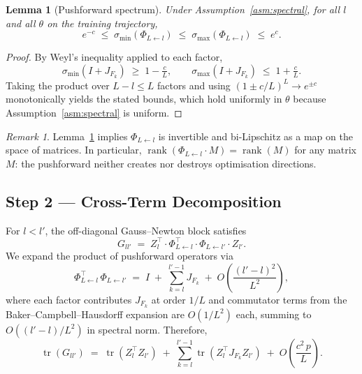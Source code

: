 \documentclass[11pt]{article}
\theoremstyle{plain}
\newtheorem{lemma}[theorem]{Lemma}
\theoremstyle{definition}
\theoremstyle{remark}
\newtheorem{remark}[theorem]{Remark}
\newcommand{\smin}{\sigma_{\min}}
\newcommand{\smax}{\sigma_{\max}}
\newcommand{\tr}{\operatorname{tr}}
\newcommand{\rank}{\operatorname{rank}}
\begin{document}
\begin{lemma}[Pushforward spectrum]
\label{lem:pushforward}
Under Assumption~\ref{asm:spectral}, for all $l$ and all $\theta$ on the
training trajectory,
\[
  e^{-c}
  \;\leq\;
  \smin\!\left(\Phi_{L\leftarrow l}\right)
  \;\leq\;
  \smax\!\left(\Phi_{L\leftarrow l}\right)
  \;\leq\;
  e^{c}.
\]
\end{lemma}

\begin{proof}
By Weyl's inequality applied to each factor,
\[
  \smin(I+J_{F_k})\;\geq\;1-\tfrac{c}{L},
  \qquad
  \smax(I+J_{F_k})\;\leq\;1+\tfrac{c}{L}.
\]
Taking the product over $L-l\leq L$ factors and using
$(1\pm c/L)^L\to e^{\pm c}$ monotonically yields the stated bounds,
which hold uniformly in $\theta$ because Assumption~\ref{asm:spectral}
is uniform.
\end{proof}

\begin{remark}
Lemma~\ref{lem:pushforward} implies $\Phi_{L\leftarrow l}$ is invertible
and bi-Lipschitz as a map on the space of matrices.  In particular,
$\rank(\Phi_{L\leftarrow l}\cdot M)=\rank(M)$ for any matrix $M$: the
pushforward neither creates nor destroys optimisation directions.
\end{remark}

\subsection{Step 2 --- Cross-Term Decomposition}

For $l < l'$, the off-diagonal Gauss--Newton block satisfies
\[
  G_{ll'}
  \;=\;
  Z_l^\top\cdot\Phi_{L\leftarrow l}^\top\cdot\Phi_{L\leftarrow l'}\cdot Z_{l'}.
\]
We expand the product of pushforward operators via
\begin{equation}
\label{eq:expand}
  \Phi_{L\leftarrow l}^\top\,\Phi_{L\leftarrow l'}
  \;=\;
  I \;+\; \sum_{k=l}^{l'-1}J_{F_k}
  \;+\; O\!\left(\frac{(l'-l)^2}{L^2}\right),
\end{equation}
where each factor contributes $J_{F_k}$ at order $1/L$ and commutator
terms from the Baker--Campbell--Hausdorff expansion are $O(1/L^2)$ each,
summing to $O((l'-l)/L^2)$ in spectral norm.  Therefore,
\begin{equation}
\label{eq:trace-expand}
  \tr(G_{ll'})
  \;=\;
  \tr\!\left(Z_l^\top Z_{l'}\right)
  \;+\;
  \sum_{k=l}^{l'-1}\tr\!\left(Z_l^\top J_{F_k} Z_{l'}\right)
  \;+\;
  O\!\left(\frac{c^2\,p}{L}\right).
\end{equation}
\end{document}
